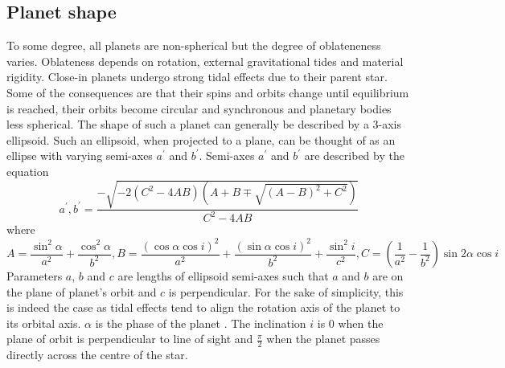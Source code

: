 \documentclass[10pt]{article}
\numberwithin{equation}{subsection}
\begin{document}
\subsection{Planet shape}
To some degree, all planets are non-spherical but the degree of oblateneness varies.
Oblateness depends on rotation, external gravitational tides and material rigidity. \cite{carter}
Close-in planets undergo strong tidal effects due to their parent star. Some of the 
consequences are that their spins and orbits change until equilibrium is reached, their
orbits become circular and synchronous and planetary bodies less spherical. \cite{correia1}
The shape of such a planet can generally be described by a 3-axis ellipsoid.
Such an ellipsoid, when projected to a plane, can be thought of as an ellipse with varying
semi-axes $a^{\prime}$ and $b^{\prime}$. Semi-axes $a^{\prime}$ and $b^{\prime}$ 
are described by the equation \cite{correia1, walterova}
\begin{equation}
  a^{\prime}, b^{\prime} = \frac{-\sqrt{-2(C^2 - 4AB)\left(A + B \mp\sqrt{(A -B)^2 + C^2}\right)}}{C^2 - 4AB}
  \label{eq:semi-axes}
\end{equation}
where 
\begin{equation}
  A = \frac{\sin^2\alpha}{a^2}+\frac{\cos^2\alpha}{b^2}, B = \frac{(\cos\alpha\cos i)^2}{a^2} + \frac{(\sin\alpha\cos i)^2}{b^2} + \frac{\sin^2 i}{c^2}, C = \left(\frac{1}{a^2} - \frac{1}{b^2}\right)\sin 2\alpha\cos i
  \label{eq:ABC}
\end{equation}
Parameters $a$, $b$ and $c$ are lengths of ellipsoid semi-axes such that $a$ and $b$
are on the plane of planet's orbit and $c$ is perpendicular. For the sake of simplicity,
this is indeed the case as tidal effects tend to align the rotation axis of the planet to
its orbital axis.
$\alpha$ is the phase of the planet . The inclination $i$ is 0 when the plane of orbit is perpendicular to line of sight
and $\frac{\pi}{2}$ when the planet passes directly across the centre of the star.
\end{document}
